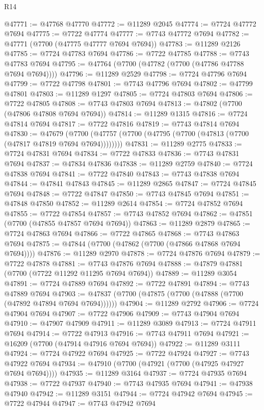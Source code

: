 \begin{lexlean}{R14}
\begin{coremodule}
@47771 := @47768 @47770
@47772 := @11289 @2045
@47774 := @7724 @47772 @7694
@47775 := @7722 @47774
@47777 := @7743 @47772 @7694
@47782 := @47771 (@7700 (@47775 @47777 @7694 @7694))
@47783 := @11289 @2126
@47785 := @7724 @47783 @7694
@47786 := @7722 @47785
@47788 := @7743 @47783 @7694
@47795 := @47764 (@7700 (@47782 (@7700 (@47786 @47788 @7694 @7694))))
@47796 := @11289 @2529
@47798 := @7724 @47796 @7694
@47799 := @7722 @47798
@47801 := @7743 @47796 @7694
@47802 := @47799 @47801
@47803 := @11289 @1297
@47805 := @7724 @47803 @7694
@47806 := @7722 @47805
@47808 := @7743 @47803 @7694
@47813 := @47802 (@7700 (@47806 @47808 @7694 @7694))
@47814 := @11289 @1315
@47816 := @7724 @47814 @7694
@47817 := @7722 @47816
@47819 := @7743 @47814 @7694
@47830 := @47679
    (@7700 (@47757 (@7700 (@47795 (@7700 (@47813 (@7700 (@47817 @47819 @7694 @7694))))))))
@47831 := @11289 @2775
@47833 := @7724 @47831 @7694
@47834 := @7722 @47833
@47836 := @7743 @47831 @7694
@47837 := @47834 @47836
@47838 := @11289 @2759
@47840 := @7724 @47838 @7694
@47841 := @7722 @47840
@47843 := @7743 @47838 @7694
@47844 := @47841 @47843
@47845 := @11289 @2865
@47847 := @7724 @47845 @7694
@47848 := @7722 @47847
@47850 := @7743 @47845 @7694
@47851 := @47848 @47850
@47852 := @11289 @2614
@47854 := @7724 @47852 @7694
@47855 := @7722 @47854
@47857 := @7743 @47852 @7694
@47862 := @47851 (@7700 (@47855 @47857 @7694 @7694))
@47863 := @11289 @2879
@47865 := @7724 @47863 @7694
@47866 := @7722 @47865
@47868 := @7743 @47863 @7694
@47875 := @47844 (@7700 (@47862 (@7700 (@47866 @47868 @7694 @7694))))
@47876 := @11289 @2970
@47878 := @7724 @47876 @7694
@47879 := @7722 @47878
@47881 := @7743 @47876 @7694
@47888 := @47879 @47881 (@7700 (@7722 @11292 @11295 @7694 @7694))
@47889 := @11289 @3054
@47891 := @7724 @47889 @7694
@47892 := @7722 @47891
@47894 := @7743 @47889 @7694
@47903 := @47837 (@7700 (@47875 (@7700 (@47888 (@7700 (@47892 @47894 @7694 @7694))))))
@47904 := @11289 @2792
@47906 := @7724 @47904 @7694
@47907 := @7722 @47906
@47909 := @7743 @47904 @7694
@47910 := @47907 @47909
@47911 := @11289 @3089
@47913 := @7724 @47911 @7694
@47914 := @7722 @47913
@47916 := @7743 @47911 @7694
@47921 := @16209 (@7700 (@47914 @47916 @7694 @7694))
@47922 := @11289 @3111
@47924 := @7724 @47922 @7694
@47925 := @7722 @47924
@47927 := @7743 @47922 @7694
@47934 := @47910 (@7700 (@47921 (@7700 (@47925 @47927 @7694 @7694))))
@47935 := @11289 @3164
@47937 := @7724 @47935 @7694
@47938 := @7722 @47937
@47940 := @7743 @47935 @7694
@47941 := @47938 @47940
@47942 := @11289 @3151
@47944 := @7724 @47942 @7694
@47945 := @7722 @47944
@47947 := @7743 @47942 @7694

\end{coremodule}
\end{lexlean}
